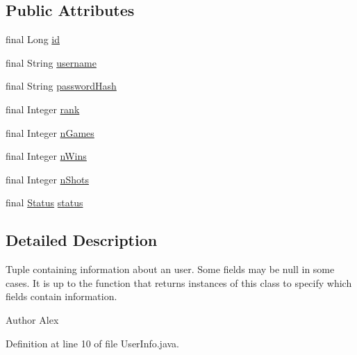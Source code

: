 \subsection*{Public Attributes}
\begin{DoxyCompactItemize}
\item 
final Long \hyperlink{classpt_1_1up_1_1fe_1_1lpro1613_1_1sharedlib_1_1structs_1_1_user_info_a2f93648cc465eb07aaa104c7490c5bf1}{id}
\item 
final String \hyperlink{classpt_1_1up_1_1fe_1_1lpro1613_1_1sharedlib_1_1structs_1_1_user_info_ac52ffa24c15ec39902b3fd840bb445f1}{username}
\item 
final String \hyperlink{classpt_1_1up_1_1fe_1_1lpro1613_1_1sharedlib_1_1structs_1_1_user_info_a462459c12a260d69419a03f4a9f21bb6}{password\+Hash}
\item 
final Integer \hyperlink{classpt_1_1up_1_1fe_1_1lpro1613_1_1sharedlib_1_1structs_1_1_user_info_afc6d51cea03d0ee5a94160fadbef62c4}{rank}
\item 
final Integer \hyperlink{classpt_1_1up_1_1fe_1_1lpro1613_1_1sharedlib_1_1structs_1_1_user_info_aa6fdbbe716d5d8b142de95e2ef21665f}{n\+Games}
\item 
final Integer \hyperlink{classpt_1_1up_1_1fe_1_1lpro1613_1_1sharedlib_1_1structs_1_1_user_info_aa9385a8d0f058c3ffdaad18496497443}{n\+Wins}
\item 
final Integer \hyperlink{classpt_1_1up_1_1fe_1_1lpro1613_1_1sharedlib_1_1structs_1_1_user_info_ae5f52d2e164a1ae282e005f4f9ec1a5c}{n\+Shots}
\item 
final \hyperlink{enumpt_1_1up_1_1fe_1_1lpro1613_1_1sharedlib_1_1structs_1_1_user_info_1_1_status}{Status} \hyperlink{classpt_1_1up_1_1fe_1_1lpro1613_1_1sharedlib_1_1structs_1_1_user_info_a553ddd0c6e2695e0384a102b046cda02}{status}
\end{DoxyCompactItemize}


\subsection{Detailed Description}
Tuple containing information about an user. Some fields may be null in some cases. It is up to the function that returns instances of this class to specify which fields contain information.

\begin{DoxyAuthor}{Author}
Alex 
\end{DoxyAuthor}


Definition at line 10 of file User\+Info.\+java.



